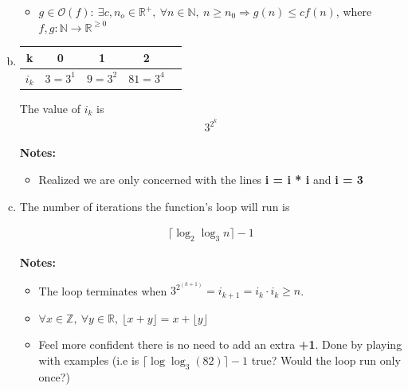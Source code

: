 \documentclass[12pt]{article}
\begin{document}
\begin{enumerate}[a.]
\begin{itemize}
        \item

        $g \in \mathcal{O}(f):\:\exists c,n_o \in \mathbb{R}^{+},\:\forall n \in
        \mathbb{N},\:n \geq n_0 \Rightarrow g(n) \leq cf(n)$, where $f,g:\mathbb{N} \to \mathbb{R}^{\geq 0}$

    \end{itemize}

    \item

    \begin{tabular}{|c|c|c|c|c|}
        \hline
        k & 0 & 1 & 2\\
        \hline
        $i_k$ & $3 = 3^1$ & $9 = 3^2$ & $81 = 3^4$\\
        \hline
    \end{tabular}

    \bigskip

    The value of $i_k$ is
    \setcounter{equation}{0}
    \begin{align}
        3^{2^k}
    \end{align}

    \bigskip

    \textbf{Notes:}

    \begin{itemize}
        \item Realized we are only concerned with the lines \textbf{i = i * i} and \textbf{i = 3}
    \end{itemize}

    \item The number of iterations the function's loop will run is

    \setcounter{equation}{0}
    \begin{align}
        \lceil \log_2 \log_3 n \rceil - 1
    \end{align}

    \textbf{Notes:}

    \begin{itemize}
        \item The loop terminates when $3^{2^{(k+1)}} = i_{k+1} = i_k \cdot i_k \geq n$.
        \item $\forall x \in \mathbb{Z},\:\forall y \in \mathbb{R},\:\lfloor x+y \rfloor = x + \lfloor y \rfloor$
        \item Feel more confident there is no need to add an extra \textbf{+1}. Done by
        playing with examples (i.e is $\lceil \log \log_3 (82) \rceil - 1$ true? Would the loop run only once?)
    \end{itemize}

\end{enumerate}
\end{document}
